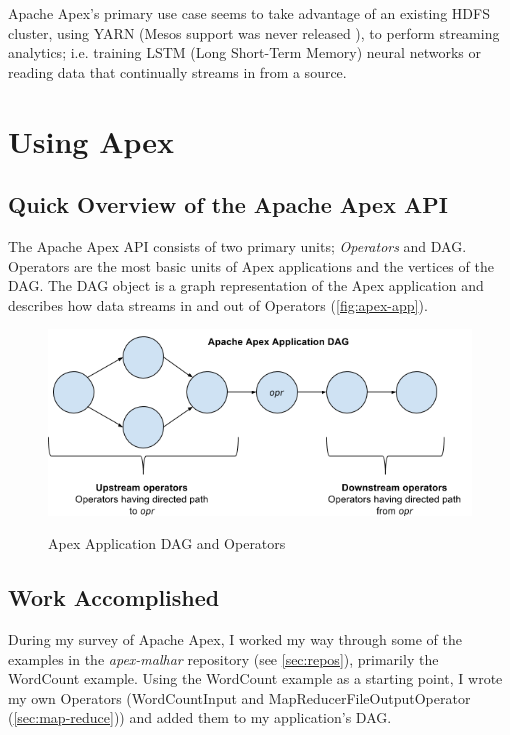 \documentclass[final]{IEEEtran}
\begin{document}
Apache Apex's primary use case seems to take advantage of an existing HDFS cluster, using YARN (Mesos support was never released \cite{APEX-JIRA}), to perform streaming analytics; i.e. training LSTM (Long Short-Term Memory) neural networks or reading data that continually streams in from a source.

\section{Using Apex}
\subsection{Quick Overview of the Apache Apex API} \label{sec:overview}
The Apache Apex API consists of two primary units; \emph{Operators} and DAG. Operators are the most basic units of Apex applications and the vertices of the DAG. The DAG object is a graph representation of the Apex application and describes how data streams in and out of Operators (\autoref{fig:apex-app})\cite{APEX-DOCS}.

\begin{figure}
  \includegraphics[scale=.4]{../images/apex-dag}
  \caption{Apex Application DAG and Operators}\cite{APEX-DOCS}
  \label{fig:apex-app}
  \centering
\end{figure}

\subsection{Work Accomplished}
During my survey of Apache Apex, I worked my way through some of the examples in the \textit{apex-malhar} repository (see \ref{sec:repos}), primarily the WordCount example. Using the WordCount example as a starting point, I wrote my own Operators (WordCountInput and MapReducerFileOutputOperator (\ref{sec:map-reduce})) and added them to my application's DAG.
\end{document}
